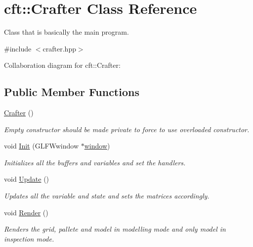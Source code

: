 \hypertarget{classcft_1_1Crafter}{}\section{cft\+:\+:Crafter Class Reference}
\label{classcft_1_1Crafter}


Class that is basically the main program.  




{\ttfamily \#include $<$crafter.\+hpp$>$}



Collaboration diagram for cft\+:\+:Crafter\+:
\subsection*{Public Member Functions}
\begin{DoxyCompactItemize}
\item 
\hyperlink{classcft_1_1Crafter_a57796fe2de2fe073c8a7ef14e2a57d21}{Crafter} ()\hypertarget{classcft_1_1Crafter_a57796fe2de2fe073c8a7ef14e2a57d21}{}\label{classcft_1_1Crafter_a57796fe2de2fe073c8a7ef14e2a57d21}

\begin{DoxyCompactList}\small\item\em Empty constructor should be made private to force to use overloaded constructor. \end{DoxyCompactList}\item 
void \hyperlink{classcft_1_1Crafter_a0e56cb6de077230dfbc29dac9adace2a}{Init} (G\+L\+F\+Wwindow $\ast$\hyperlink{classcft_1_1Crafter_a70b8292b32d9eda7b3ce9e8c86161042}{window})\hypertarget{classcft_1_1Crafter_a0e56cb6de077230dfbc29dac9adace2a}{}\label{classcft_1_1Crafter_a0e56cb6de077230dfbc29dac9adace2a}

\begin{DoxyCompactList}\small\item\em Initializes all the buffers and variables and set the handlers. \end{DoxyCompactList}\item 
void \hyperlink{classcft_1_1Crafter_ad08567005970bdd4b33c2d3816ba4e5d}{Update} ()\hypertarget{classcft_1_1Crafter_ad08567005970bdd4b33c2d3816ba4e5d}{}\label{classcft_1_1Crafter_ad08567005970bdd4b33c2d3816ba4e5d}

\begin{DoxyCompactList}\small\item\em Updates all the variable and state and sets the matrices accordingly. \end{DoxyCompactList}\item 
void \hyperlink{classcft_1_1Crafter_a018462b2e4daf890ac697acbbc1f14d3}{Render} ()\hypertarget{classcft_1_1Crafter_a018462b2e4daf890ac697acbbc1f14d3}{}\label{classcft_1_1Crafter_a018462b2e4daf890ac697acbbc1f14d3}

\begin{DoxyCompactList}\small\item\em Renders the grid, pallete and model in modelling mode and only model in inspection mode. \end{DoxyCompactList}\end{DoxyCompactItemize}
